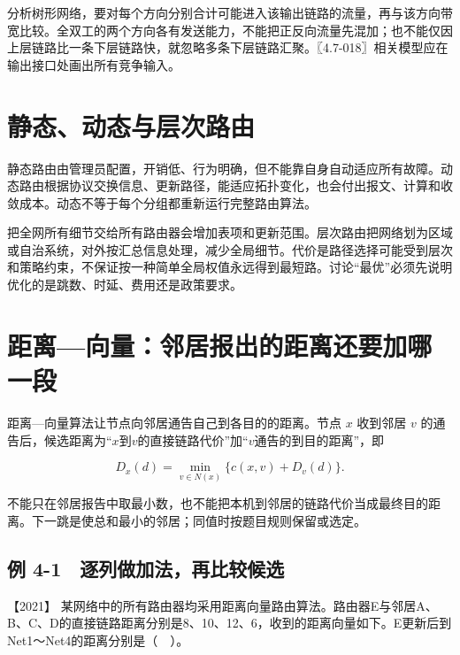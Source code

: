 分析树形网络，要对每个方向分别合计可能进入该输出链路的流量，再与该方向带宽比较。全双工的两个方向各有发送能力，不能把正反向流量先混加；也不能仅因上层链路比一条下层链路快，就忽略多条下层链路汇聚。〖4.7-018〗相关模型应在输出接口处画出所有竞争输入。

\section{静态、动态与层次路由}\label{cn-04-04}

静态路由由管理员配置，开销低、行为明确，但不能靠自身自动适应所有故障。动态路由根据协议交换信息、更新路径，能适应拓扑变化，也会付出报文、计算和收敛成本。动态不等于每个分组都重新运行完整路由算法。

把全网所有细节交给所有路由器会增加表项和更新范围。层次路由把网络划为区域或自治系统，对外按汇总信息处理，减少全局细节。代价是路径选择可能受到层次和策略约束，不保证按一种简单全局权值永远得到最短路。讨论``最优''必须先说明优化的是跳数、时延、费用还是政策要求。

\section{距离---向量：邻居报出的距离还要加哪一段}\label{cn-04-05}

距离---向量算法让节点向邻居通告自己到各目的的距离。节点 \(x\) 收到邻居 \(v\) 的通告后，候选距离为``\(x\)到\(v\)的直接链路代价''加``\(v\)通告的到目的距离''，即

\[D_x(d)=\min_{v\in N(x)}\{c(x,v)+D_v(d)\}.\]

不能只在邻居报告中取最小数，也不能把本机到邻居的链路代价当成最终目的距离。下一跳是使总和最小的邻居；同值时按题目规则保留或选定。

\subsection{例 4-1　逐列做加法，再比较候选}\label{cn-ex4-1}

\noindent{}【2021】 某网络中的所有路由器均采用距离向量路由算法。路由器E与邻居A、B、C、D的直接链路距离分别是8、10、12、6，收到的距离向量如下。E更新后到Net1～Net4的距离分别是（　）。

